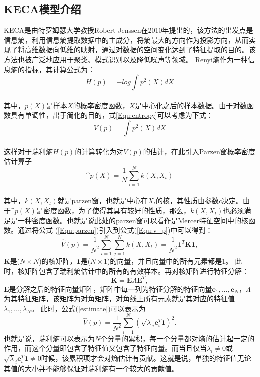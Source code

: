 \subsection{KECA模型介绍}
KECA是由特罗姆瑟大学教授Robert Jenssen在2010年提出的，该方法的出发点是信息熵，利用信息熵提取数据中的主成分，将熵最大的方向作为投影方向，从而实现了将高维数据向低维的映射，通过对数据的空间变化达到了特征提取的目的。该方法也被广泛地应用于聚类、模式识别以及降低噪声等领域。
Renyi熵作为一种信息熵的指标，其计算公式为：
\begin{equation}
\label{Equ:entropy}
H(p)=-log\int p^2(X)dX
\end{equation}\\
其中，$p(X)$是样本$X$的概率密度函数，$X$是中心化之后的样本数据。由于对数函数具有单调性，出于简化的目的，式\ref{Equ:entropy}可以考虑为下式：
\begin{equation}
\label{Equ:v_p}
V(p)= \int p^2(X)dX
\end{equation}\\
这样对于瑞利熵$H(p)$的计算转化为对$V(p)$的估计，在此引入Parzen窗概率密度估计算子
\begin{equation}
\label{Equ:parzen}
\^{p}(X)=\frac{1}{N}\sum \limits_{i=1}^{N}k(X,X_t)
\end{equation}\\
其中，$k(X,X_t)$就是parzen窗，也就是中心在$X_t$的核，其性质由参数$c$决定。由于$\^{p}(X)$是密度函数，为了使得其具有较好的性质，那么，$k(X,X_t)$也必须满足是一种密度函数。也就是说此处的parzen窗可以看作是Mercer特征空间中的核函数。通过将公式
(\ref{Equ:parzen})引入到公式(\ref{Equ:v_p})中可以得到：
\begin{equation}\label{estimate}
\hat{V}(p)=\frac{1}{N^2}\sum \limits_{i=1}^{N}\sum \limits_{j=1}^{N}k(X,X_t)=\frac{1}{N^2}\textbf{1}^T\textbf{K}\textbf{1},
\end{equation}
$\textbf{K}$是($N\times N$)的核矩阵，$\textbf{1}$是($N\times 1$)的向量，并且向量中的所有元素都是1。 此时，核矩阵包含了瑞利熵估计中的所有的有效样本。再对核矩阵进行特征分解：
\begin{equation}
\textbf{K}=\textbf{E}\Lambda\textbf{E}^T,
\end{equation}
$\textbf{E}$是分解之后的特征向量矩阵，矩阵中每一列为特征分解的特征向量$\mathbf{e}_1,...,\mathbf{e}_N$，$\Lambda$为其特征矩阵，该矩阵为对角矩阵，对角线上所有元素就是其对应的特征值$\lambda_1,...,\lambda_N$。 此时，公式(\ref{estimate})可以表示为
\begin{equation}\label{eigdec}
\hat{V}(p)=\frac{1}{N^2}\sum \limits_{i=1}^{N}(\sqrt\lambda_i \mathbf{e}_i^T\textbf{1})^2.
\end{equation}%
也就是说，瑞利熵可以表示为$N$个分量的累积，每一个分量都对熵的估计起一定的作用，而这个分量即包含了特征值又包含了特征向量。而当且仅当$\lambda_i \neq 0$或 $\sqrt\lambda_i\mathbf{e}_i^T\textbf{1} \neq 0$时候，该累积项才会对熵估计有贡献。这就是说，单独的特征值无论其值的大小并不能够保证对瑞利熵有一个较大的贡献值。

